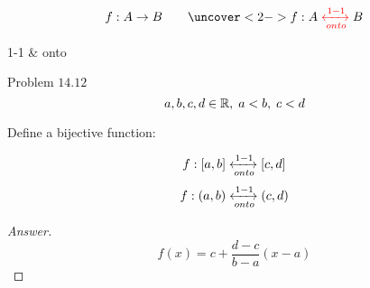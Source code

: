 

\begin{frame}{}
  \begin{definition}
    \[
      f: A \to B \qquad \uncover<2->{f: A \red{\;\xleftrightarrow[onto]{1-1}\;} B}
    \]

    \vspace{0.50cm}
    \centerline{1-1 \& onto}
  \end{definition}
\end{frame}

\begin{frame}{}
  \begin{exampleblock}{Problem $14.12$}
    \[
      a, b, c, d \in \mathbb{R}{},\; a < b,\; c < d
    \]

    \vspace{0.30cm}
    \centerline{Define a bijective function:}
    \vspace{0.10cm}

    \[
      f: [a,b] \xleftrightarrow[onto]{1-1} [c,d]
    \]
    \[
      f: (a,b) \xleftrightarrow[onto]{1-1} (c,d)
    \]
  \end{exampleblock}

  \begin{proof}[Answer]
    \[
      f(x) = c + \frac{d-c}{b-a}(x-a)
    \]
  \end{proof}
\end{frame}
